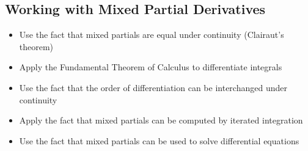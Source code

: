 \subsection*{Working with Mixed Partial Derivatives}
\begin{itemize}
\item Use the fact that mixed partials are equal under continuity (Clairaut's theorem)
\item Apply the Fundamental Theorem of Calculus to differentiate integrals
\item Use the fact that the order of differentiation can be interchanged under continuity
\item Apply the fact that mixed partials can be computed by iterated integration
\item Use the fact that mixed partials can be used to solve differential equations
\end{itemize}